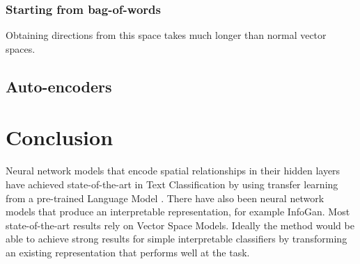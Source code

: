 \subsubsection{Starting from bag-of-words}

Obtaining directions from this space takes much longer than normal vector spaces.

\subsection{Auto-encoders}

\section{Conclusion}



 Neural network models that encode spatial relationships in their hidden layers have achieved state-of-the-art in Text Classification by using transfer learning from a pre-trained Language Model \cite{Gong2018}. There have also been neural network models that produce an interpretable representation, for example InfoGan.
 Most state-of-the-art results rely on Vector Space Models. Ideally the method would be able to achieve strong results for simple interpretable classifiers by transforming an existing representation that performs well at the task.
 

